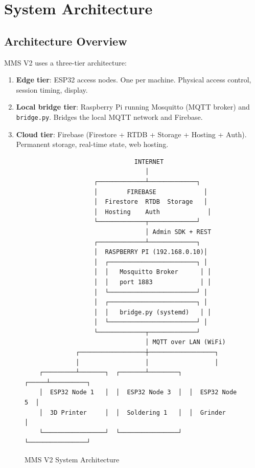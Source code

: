 \chapter{System Architecture}
\label{ch:architecture}

\section{Architecture Overview}

MMS V2 uses a three-tier architecture:

\begin{enumerate}[leftmargin=1.5em]
    \item \textbf{Edge tier}: ESP32 access nodes. One per machine. Physical access control, session timing, display.
    \item \textbf{Local bridge tier}: Raspberry Pi running Mosquitto (MQTT broker) and \texttt{bridge.py}. Bridges the local MQTT network and Firebase.
    \item \textbf{Cloud tier}: Firebase (Firestore + RTDB + Storage + Hosting + Auth). Permanent storage, real-time state, web hosting.
\end{enumerate}

\begin{figure}[H]
\centering
\begin{verbatim}
                              INTERNET
                                 │
                   ┌─────────────┴─────────────┐
                   │        FIREBASE             │
                   │  Firestore  RTDB  Storage   │
                   │  Hosting    Auth             │
                   └─────────────┬─────────────┘
                                 │ Admin SDK + REST
                   ┌─────────────┴─────────────┐
                   │  RASPBERRY PI (192.168.0.10)│
                   │  ┌────────────────────────┐ │
                   │  │   Mosquitto Broker      │ │
                   │  │   port 1883             │ │
                   │  └────────────────────────┘ │
                   │  ┌────────────────────────┐ │
                   │  │   bridge.py (systemd)   │ │
                   │  └────────────────────────┘ │
                   └─────────────┬─────────────┘
                                 │ MQTT over LAN (WiFi)
              ┌──────────────────┼──────────────────┐
              │                  │                  │
    ┌─────────┴───────┐  ┌───────┴────────┐  ┌─────┴──────────┐
    │  ESP32 Node 1   │  │  ESP32 Node 3  │  │  ESP32 Node 5  │
    │  3D Printer     │  │  Soldering 1   │  │  Grinder       │
    └─────────────────┘  └────────────────┘  └────────────────┘
\end{verbatim}
\caption{MMS V2 System Architecture}
\label{fig:architecture}
\end{figure}

